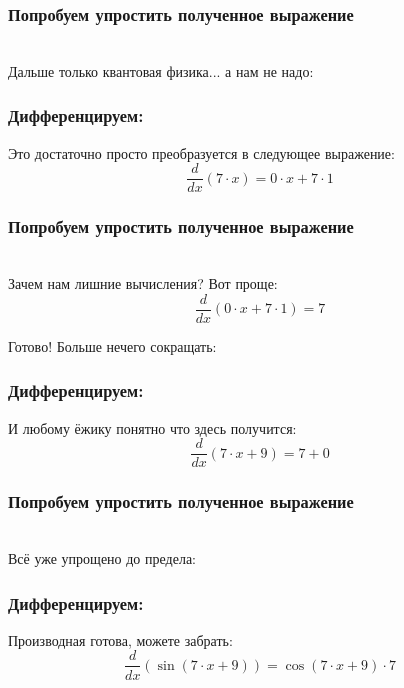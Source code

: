 \documentclass[a4paper,12pt]{article}
\begin{document}
\subsubsection*{Попробуем упростить полученное выражение}
\\Дальше только квантовая физика... а нам не надо:

\subsubsection*{Дифференцируем:}

Это достаточно просто преобразуется в следующее выражение:
\begin{dmath}\frac{d}{dx}\left(7\cdot x\right)=0\cdot x+ 7\cdot 1\end{dmath}
\subsubsection*{Попробуем упростить полученное выражение}
\\Зачем нам лишние вычисления? Вот проще:\\
\begin{dmath}
	\frac{d}{dx}\left(0\cdot x+ 7\cdot 1\right) = 7\end{dmath}

Готово! Больше нечего сокращать:

\subsubsection*{Дифференцируем:}

И любому ёжику понятно что здесь получится:
\begin{dmath}\frac{d}{dx}\left(7\cdot x+ 9\right)=7+ 0\end{dmath}
\subsubsection*{Попробуем упростить полученное выражение}
\\Всё уже упрощено до предела:

\subsubsection*{Дифференцируем:}

Производная готова, можете забрать:
\begin{dmath}\frac{d}{dx}\left(\operatorname{sin}\left(7\cdot x+ 9\right) \right)=\operatorname{cos}\left(7\cdot x+ 9\right) \cdot 7\end{dmath}
\end{document}
